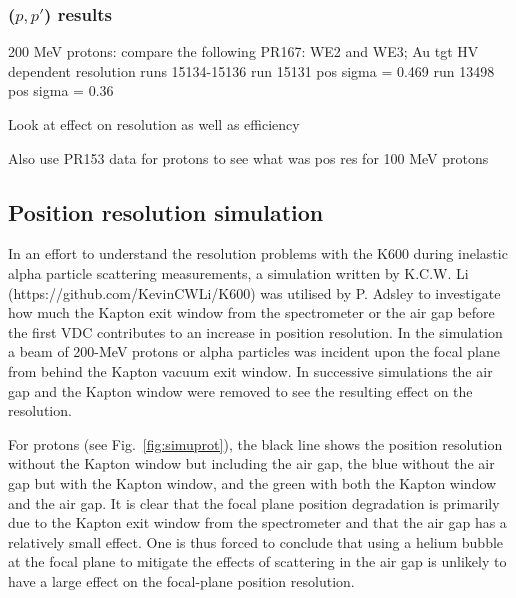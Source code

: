 \documentclass[11pt]{report}
\begin{document}
\subsubsection{($p,p'$) results}\label{subsubsec:posres}


\bigskip

200 MeV protons:
compare the following PR167: WE2  and WE3; Au tgt
HV dependent resolution runs 15134-15136
run 15131 pos sigma = 0.469
run 13498 pos sigma = 0.36

Look at effect on resolution as well as efficiency



Also use PR153 data for protons to see what was pos res
for 100 MeV protons



\subsection{Position resolution simulation}

In an effort to understand the resolution problems with the K600 during inelastic alpha particle scattering measurements, a simulation written by K.C.W. Li (https://github.com/KevinCWLi/K600) was utilised by P. Adsley to investigate how much the Kapton exit window from the spectrometer or the air gap before the first VDC contributes to an increase in position resolution. In the simulation a beam of 200-MeV protons or alpha particles was incident upon the focal plane from behind the Kapton vacuum exit window. In successive simulations the air gap and the Kapton window were removed to see the resulting effect on the resolution.

For protons (see Fig.~\ref{fig:simuprot}), the black line shows the position resolution without the Kapton window but including the air gap, the blue without the air gap but with the Kapton window, and the green with both the Kapton window and the air gap. It is clear that the focal plane position degradation is primarily due to the Kapton exit window from the spectrometer and that the air gap has a relatively small effect. One is thus forced to conclude that using a helium bubble at the focal plane to mitigate the effects of scattering in the air gap is unlikely to have a large effect on the focal-plane position resolution.
\end{document}
